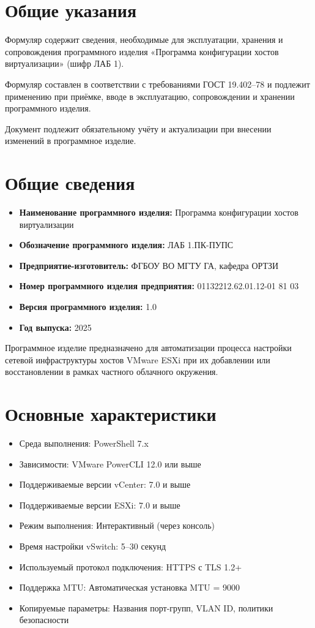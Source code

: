 \section{Общие указания}

Формуляр содержит сведения, необходимые для эксплуатации, хранения и сопровождения программного изделия «Программа конфигурации хостов виртуализации» (шифр ЛАБ 1). 

Формуляр составлен в соответствии с требованиями ГОСТ 19.402–78 и подлежит применению при приёмке, вводе в эксплуатацию, сопровождении и хранении программного изделия.

Документ подлежит обязательному учёту и актуализации при внесении изменений в программное изделие.

\newpage
\section{Общие сведения}

\begin{itemize}
  \item \textbf{Наименование программного изделия:} Программа конфигурации хостов виртуализации
  \item \textbf{Обозначение программного изделия:} ЛАБ 1.ПК-ПУПС
  \item \textbf{Предприятие-изготовитель:} ФГБОУ ВО МГТУ ГА, кафедра ОРТЗИ
  \item \textbf{Номер программного изделия предприятия:} 01132212.62.01.12-01 81 03
  \item \textbf{Версия программного изделия:} 1.0
  \item \textbf{Год выпуска:} 2025
\end{itemize}

Программное изделие предназначено для автоматизации процесса настройки сетевой инфраструктуры хостов VMware ESXi при их добавлении или восстановлении в рамках частного облачного окружения.
\newpage
\section{Основные характеристики}

\begin{itemize}
  \item Среда выполнения: PowerShell 7.x
  \item Зависимости: VMware PowerCLI 12.0 или выше
  \item Поддерживаемые версии vCenter: 7.0 и выше
  \item Поддерживаемые версии ESXi: 7.0 и выше
  \item Режим выполнения: Интерактивный (через консоль)
  \item Время настройки vSwitch: 5–30 секунд
  \item Используемый протокол подключения: HTTPS с TLS 1.2+
  \item Поддержка MTU: Автоматическая установка MTU = 9000
  \item Копируемые параметры: Названия порт-групп, VLAN ID, политики безопасности
\end{itemize}

